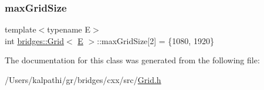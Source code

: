 \mbox{\label{classbridges_1_1_grid_a800909a94e0affac82da79cf3e6d03e5}} 
\subsubsection{\texorpdfstring{maxGridSize}{maxGridSize}}
{\footnotesize\ttfamily template$<$typename E$>$ \\
int \mbox{\hyperlink{classbridges_1_1_grid}{bridges\+::\+Grid}}$<$ \mbox{\hyperlink{namespacebridges_acfb0a4f7877d8f63de3e6862004c50eda3a3ea00cfc35332cedf6e5e9a32e94da}{E}} $>$\+::max\+Grid\+Size\mbox{[}2\mbox{]} = \{1080, 1920\}\hspace{0.3cm}{\ttfamily [protected]}}



The documentation for this class was generated from the following file\+:\begin{DoxyCompactItemize}
\item 
/\+Users/kalpathi/gr/bridges/cxx/src/\mbox{\hyperlink{_grid_8h}{Grid.\+h}}\end{DoxyCompactItemize}

